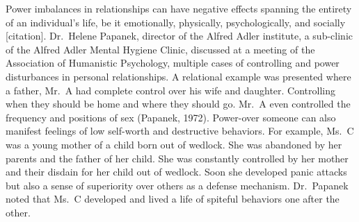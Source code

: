 \documentclass[
  english,
  donotrepeattitle,doc, 12pt, a4paper,floatsintext]{apa7}
\begin{document}
Power imbalances in relationships can have negative effects spanning the entirety of an individual's life, be it emotionally, physically, psychologically, and socially {[}citation{]}. Dr.~Helene Papanek, director of the Alfred Adler institute, a sub-clinic of the Alfred Adler Mental Hygiene Clinic, discussed at a meeting of the Association of Humanistic Psychology, multiple cases of controlling and power disturbances in personal relationships. A relational example was presented where a father, Mr.~A had complete control over his wife and daughter. Controlling when they should be home and where they should go. Mr.~A even controlled the frequency and positions of sex (Papanek, 1972). Power-over someone can also manifest feelings of low self-worth and destructive behaviors. For example, Ms.~C was a young mother of a child born out of wedlock. She was abandoned by her parents and the father of her child. She was constantly controlled by her mother and their disdain for her child out of wedlock. Soon she developed panic attacks but also a sense of superiority over others as a defense mechanism. Dr.~Papanek noted that Ms.~C developed and lived a life of spiteful behaviors one after the other.
\end{document}

